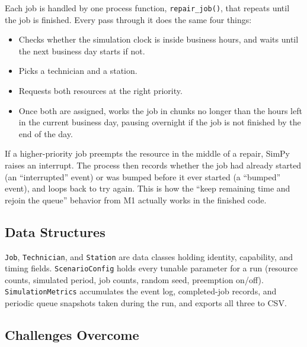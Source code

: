 \documentclass[12pt, letterpaper, twoside]{article}
\begin{document}
Each job is handled by one process function, \texttt{repair\_job()}, that repeats until
the job is finished. Every pass through it does the same four things:

\begin{itemize}
    \item Checks whether the simulation clock is inside business hours, and waits until
    the next business day starts if not.
    \item Picks a technician and a station.
    \item Requests both resources at the right priority.
    \item Once both are assigned, works the job in chunks no longer than the hours left in
    the current business day, pausing overnight if the job is not finished by the end of
    the day.
\end{itemize}

If a higher-priority job preempts the resource in the middle of a repair, SimPy raises an
interrupt. The process then records whether the job had already started (an
``interrupted'' event) or was bumped before it ever started (a ``bumped'' event), and
loops back to try again. This is how the ``keep remaining time and rejoin the queue''
behavior from M1 actually works in the finished code.

\subsection{Data Structures}

\texttt{Job}, \texttt{Technician}, and \texttt{Station} are data classes holding
identity, capability, and timing fields. \texttt{ScenarioConfig} holds every tunable
parameter for a run (resource counts, simulated period, job counts, random seed,
preemption on/off). \texttt{SimulationMetrics} accumulates the event log, completed-job
records, and periodic queue snapshots taken during the run, and exports all three to CSV.

\subsection{Challenges Overcome}
\end{document}
